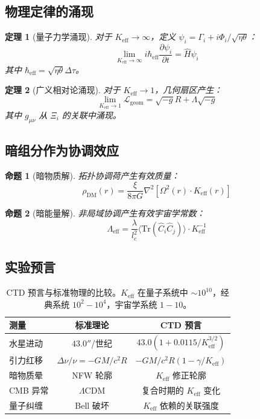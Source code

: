 \documentclass[11pt,a4paper]{article}
\newtheorem{theorem}{定理}
\newtheorem{proposition}{命题}
\begin{document}
	\subsection{物理定律的涌现}
	
	\begin{theorem}[量子力学涌现]
		对于 $K_{\mathrm{eff}} \to \infty$，定义 $\psi_i = \Gamma_i + i\Phi_i/\sqrt{\eta\theta}$：
		\[
		\lim_{K_{\mathrm{eff}} \to \infty} i\hbar_{\mathrm{eff}}\frac{\partial\psi_i}{\partial t} = \hat{H}\psi_i
		\]
		其中 $\hbar_{\mathrm{eff}} = \sqrt{\eta\theta}\Delta\tau$。
	\end{theorem}
	
	\begin{theorem}[广义相对论涌现]
		对于 $K_{\mathrm{eff}} \to 1$，几何扇区产生：
		\[
		\lim_{K_{\mathrm{eff}} \to 1} \mathcal{L}_{\mathrm{geom}} = \sqrt{-g}R + \Lambda\sqrt{-g}
		\]
		其中 $g_{\mu\nu}$ 从 $\Xi_i$ 的关联中涌现。
	\end{theorem}
	
	\subsection{暗组分作为协调效应}
	
	\begin{proposition}[暗物质解]
		拓扑协调荷产生有效质量：
		\[
		\rho_{\mathrm{DM}}(r) = \frac{\xi}{8\pi G} \nabla^2 \left[ \Omega^2(r) \cdot K_{\mathrm{eff}}(r) \right]
		\]
	\end{proposition}
	
	\begin{proposition}[暗能量解]
		非局域协调产生有效宇宙学常数：
		\[
		\Lambda_{\mathrm{eff}} = \frac{\lambda}{l_c^2} \langle \mathrm{Tr}(\hat{C}_i\hat{C}_j) \rangle \cdot K_{\mathrm{eff}}^{-1}
		\]
	\end{proposition}
	
	\subsection{实验预言}
	
	\begin{table}[htbp]
		\centering
		\begin{tabular}{lcc}
			\toprule
			\textbf{测量} & \textbf{标准理论} & \textbf{CTD 预言} \\
			\midrule
			水星进动 & $43.0''$/世纪 & $43.0(1 + 0.0115/K_{\mathrm{eff}}^{3/2})$ \\
			引力红移 & $\Delta\nu/\nu = -GM/c^2R$ & $-GM/c^2R(1 - \gamma/K_{\mathrm{eff}})$ \\
			暗物质晕 & NFW 轮廓 & $K_{\mathrm{eff}}$ 修正轮廓 \\
			CMB 异常 & $\Lambda$CDM & 复合时期的 $K_{\mathrm{eff}}$ 变化 \\
			量子纠缠 & Bell 破坏 & $K_{\mathrm{eff}}$ 依赖的关联强度 \\
			\bottomrule
		\end{tabular}
		\caption{CTD 预言与标准物理的比较。$K_{\mathrm{eff}}$ 在量子系统中 $\sim 10^{10}$，经典系统 $10^2-10^4$，宇宙学系统 $1-10$。}
	\end{table}
	
\end{document}

